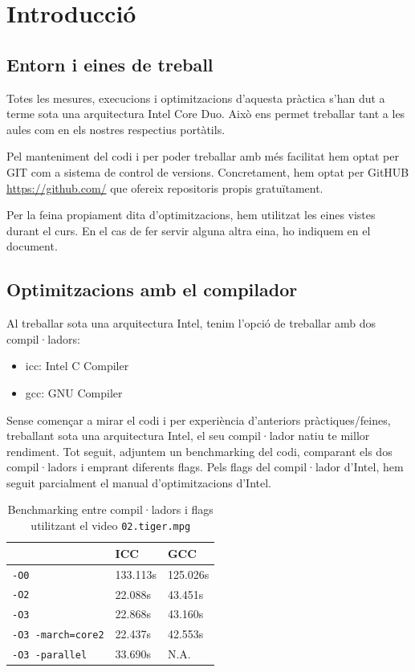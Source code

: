 \chapter{Introducci\'o}

\section{Entorn i eines de treball}
Totes les mesures, execucions i optimitzacions d'aquesta pràctica s'han dut a terme sota una arquitectura Intel Core Duo. Això ens permet treballar tant a les aules com en els nostres respectius portàtils.

Pel manteniment del codi i per poder treballar amb més facilitat hem optat per GIT com a sistema de control de versions. Concretament, hem optat per GitHUB \url{https://github.com/} que ofereix repositoris propis gratuïtament.

Per la feina propiament dita d'optimitzacions, hem utilitzat les eines vistes durant el curs. En el cas de fer servir alguna altra eina, ho indiquem en el document.

\section{Optimitzacions amb el compilador}
Al treballar sota una arquitectura Intel, tenim l'opció de treballar amb dos compil·ladors:

\begin{itemize}
  \item icc: Intel C Compiler
  \item gcc: GNU Compiler
\end{itemize}

Sense començar a mirar el codi i per experiència d'anteriors pràctiques/feines, treballant sota una arquitectura Intel, el seu compil·lador natiu te millor rendiment. Tot seguit, adjuntem un benchmarking del codi, comparant els dos compil·ladors i emprant diferents flags. Pels flags del compil·lador d'Intel, hem seguit parcialment el manual d'optimitzacions d'Intel.

\begin{table}
\begin{center}
\begin{tabular}{lll}
\hline
 & ICC & GCC \\
\hline
\texttt{-O0} & 133.113s & 125.026s \\
\texttt{-O2} & 22.088s & 43.451s \\
\texttt{-O3} & 22.868s & 43.160s \\
\texttt{-O3 -march=core2} & 22.437s & 42.553s \\
\texttt{-O3 -parallel} & 33.690s & N.A.\\
\hline
\end{tabular}
\caption{Benchmarking entre compil·ladors i flags utilitzant el video \texttt{02.tiger.mpg}}
\end{center}
\label{table1}
\end{table}

